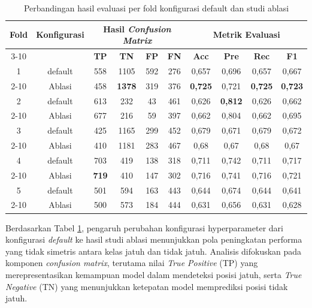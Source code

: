 \begin{table}[htbp]
    \centering
    \caption{Perbandingan hasil evaluasi per fold konfigurasi default dan studi ablasi}
    \label{tab:perbandingan cm default ablasi}
    \begin{tabular}{|c|c|c|c|c|c|c|c|c|c|}
        \hline
        \multirow{2}{*}{\textbf{Fold}} & \multirow{2}{*}{\textbf{Konfigurasi}} & \multicolumn{4}{c|}{\textbf{Hasil \textit{Confusion Matrix}}} & \multicolumn{4}{c|}{\textbf{Metrik Evaluasi}} \\ \cline{3-10}
         & & \textbf{TP} & \textbf{TN} & \textbf{FP} & \textbf{FN} & \textbf{Acc} & \textbf{Pre} & \textbf{Rec} & \textbf{F1} \\ \hline
        1 & default & 558 & 1105 & 592 & 276 & 0,657 & 0,696 & 0,657 & 0,667 \\ \cline{2-10}
         & Ablasi & 458 & \textbf{1378} & 319 & 376 & \textbf{0,725} & 0,721 & \textbf{0,725} & \textbf{0,723} \\ \hline
        2 & default & 613 & 232 & 43 & 461 & 0,626 & \textbf{0,812} & 0,626 & 0,662 \\ \cline{2-10}
         & Ablasi & 677 & 216 & 59 & 397 & 0,662 & 0,804 & 0,662 & 0,695 \\ \hline
        3 & default & 425 & 1165 & 299 & 452 & 0,679 & 0,671 & 0,679 & 0,672 \\ \cline{2-10}
         & Ablasi & 410 & 1181 & 283 & 467 & 0,68 & 0,67 & 0,68 & 0,67 \\ \hline
        4 & default & 703 & 419 & 138 & 318 & 0,711 & 0,742 & 0,711 & 0,717 \\ \cline{2-10}
         & Ablasi & \textbf{719} & 410 & 147 & 302 & 0,716 & 0,741 & 0,716 & 0,721 \\ \hline
        5 & default & 501 & 594 & 163 & 443 & 0,644 & 0,674 & 0,644 & 0,641 \\ \cline{2-10}
         & Ablasi & 500  & 573 & 184 & 444 & 0,631 & 0,656 & 0,631 & 0,628 \\ \hline
    \end{tabular}
\end{table}

Berdasarkan Tabel \ref{tab:perbandingan cm default ablasi}, pengaruh perubahan konfigurasi hyperparameter dari konfigurasi \textit{default} ke hasil studi ablasi menunjukkan pola peningkatan performa yang tidak simetris antara kelas jatuh dan tidak jatuh. Analisis difokuskan pada komponen \textit{confusion matrix}, terutama nilai \textit{True Positive} (TP) yang merepresentasikan kemampuan model dalam mendeteksi posisi jatuh, serta \textit{True Negative} (TN) yang menunjukkan ketepatan model memprediksi posisi tidak jatuh. \par

